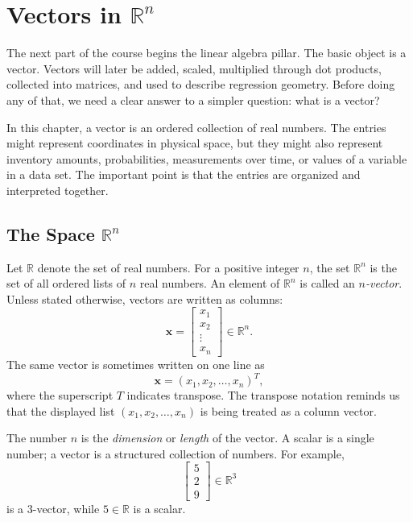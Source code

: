 \chapter{Vectors in \texorpdfstring{$\mathbb{R}^n$}{R\string^n}}
\label{mf:ch02-vectors-rn}

The next part of the course begins the linear algebra pillar. The basic object is a vector. Vectors will later be added, scaled, multiplied through dot products, collected into matrices, and used to describe regression geometry. Before doing any of that, we need a clear answer to a simpler question: what is a vector?

In this chapter, a vector is an ordered collection of real numbers. The entries might represent coordinates in physical space, but they might also represent inventory amounts, probabilities, measurements over time, or values of a variable in a data set. The important point is that the entries are organized and interpreted together.

\section{The Space \texorpdfstring{$\mathbb{R}^n$}{R\string^n}}
\label{mf:vectors-rn}

Let \(\mathbb{R}\) denote the set of real numbers. For a positive integer \(n\), the set \(\mathbb{R}^n\) is the set of all ordered lists of \(n\) real numbers. An element of \(\mathbb{R}^n\) is called an \emph{\(n\)-vector}. Unless stated otherwise, vectors are written as columns:
\[
\mathbf{x}
=
\begin{bmatrix}
 x_1 \\
 x_2 \\
 \vdots \\
 x_n
\end{bmatrix}
\in \mathbb{R}^n.
\]
The same vector is sometimes written on one line as
\[
\mathbf{x} = (x_1,x_2,\ldots,x_n)^T,
\]
where the superscript \(T\) indicates transpose. The transpose notation reminds us that the displayed list \((x_1,x_2,\ldots,x_n)\) is being treated as a column vector.

The number \(n\) is the \emph{dimension} or \emph{length} of the vector. A scalar is a single number; a vector is a structured collection of numbers. For example,
\[
\begin{bmatrix}
5 \\
2 \\
9
\end{bmatrix}
\in \mathbb{R}^3
\]
is a 3-vector, while \(5\in\mathbb{R}\) is a scalar.

